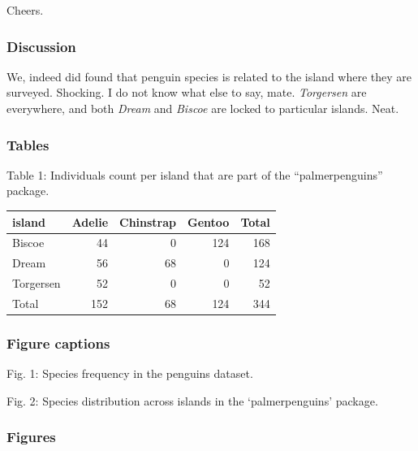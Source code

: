 \documentclass[
]{article}
\begin{document}
Cheers.

\hypertarget{discussion}{%
\subsubsection{Discussion}\label{discussion}}

We, indeed did found that penguin species is related to the island where
they are surveyed. Shocking. I do not know what else to say, mate.
\emph{Torgersen} are everywhere, and both \emph{Dream} and \emph{Biscoe}
are locked to particular islands. Neat.

\hypertarget{tables}{%
\subsubsection{Tables}\label{tables}}

Table 1: Individuals count per island that are part of the
``palmerpenguins'' package.

\begin{longtable}[]{@{}lrrrr@{}}
\toprule\noalign{}
island & Adelie & Chinstrap & Gentoo & Total \\
\midrule\noalign{}
\endhead
\bottomrule\noalign{}
\endlastfoot
Biscoe & 44 & 0 & 124 & 168 \\
Dream & 56 & 68 & 0 & 124 \\
Torgersen & 52 & 0 & 0 & 52 \\
Total & 152 & 68 & 124 & 344 \\
\end{longtable}

\hypertarget{figure-captions}{%
\subsubsection{Figure captions}\label{figure-captions}}

Fig. 1: Species frequency in the penguins dataset.

Fig. 2: Species distribution across islands in the `palmerpenguins'
package.

\hypertarget{figures}{%
\subsubsection{Figures}\label{figures}}
\end{document}
